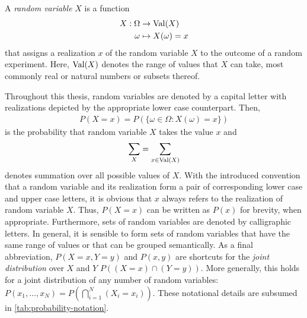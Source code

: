 \begin{mydef}
    \label{def:random-var}
    A \emph{random variable} $X$ is a function
    \begin{align}
        \label{eq:random-var}
        X:\Omega &\to \operatorname{Val}(X) \\
        \omega &\mapsto X(\omega) = x
    \end{align}
    that assigns a realization $x$ of the random variable $X$ to the outcome of a random
    experiment. Here, $\operatorname{Val}(X)$ denotes the range of values that
    $X$ can take, most commonly real or natural numbers or subsets thereof.
\end{mydef}
Throughout this thesis, random variables are denoted by a capital letter with realizations depicted
by the appropriate lower case counterpart.
Then, 
\begin{align}
    P(X=x)=P\left(\{\omega \in \Omega : X(\omega) = x\}\right)
\end{align}
is the probability that random variable $X$ takes the value $x$ and
\begin{align}
    \sum_{X} = \sum_{x \in \operatorname{Val}(X)}
\end{align}
denotes summation over all possible values of $X$. With the introduced convention that a random
variable and its realization form a pair of corresponding lower case and upper case letters, it is
obvious that $x$ always refers to the realization of random variable $X$. Thus, $P(X=x)$ can be
written as $P(x)$ for brevity, when appropriate. Furthermore, sets of random variables are denoted
by calligraphic letters. In general, it is sensible to form sets of random variables that have the
same range of values or that can be grouped semantically. As a final abbreviation, $P(X=x,Y=y)$ and
$P(x,y)$ are shortcuts for the \emph{joint distribution} over $X$ and $Y$ $P\left((X=x) \cap
    (Y=y)\right)$. More generally, this holds for a joint distribution of any number of random
variables: $P(x_1,\hdots,x_N) = P\left(\bigcap_{i=1}^N(X_i=x_i)\right)$. These notational details
are subsumed in \cref{tab:probability-notation}.

